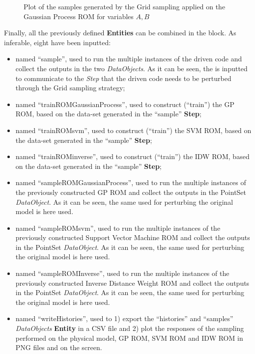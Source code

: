 \begin{enumerate}
\begin{figure}[h!]
  \caption{Plot of the samples generated by the Grid sampling applied on the Gaussian Process ROM for variables $A,B$}
  \label{fig:ROMgp_samples}
 \end{figure}
   Finally, all the previously defined \textbf{Entities} can be combined in
   the  block. As inferable,
   eight  have been inputted:
   \begin{itemize}
     \item {} named ``sample'', used to run the multiple
     instances of the driven code and
     collect the outputs in the two \textit{DataObjects}. As it can be
     seen, the  is inputted to communicate to the
     \textit{Step} that the driven code needs to
     be perturbed through the Grid sampling strategy;
     \item {} named ``trainROMGaussianProcess'', used to construct (``train'')
     the GP ROM, based on the data-set generated in the  ``sample'' \textbf{Step};
     \item {} named ``trainROMsvm'', used to construct (``train'')
     the SVM ROM, based on the data-set generated in the  ``sample'' \textbf{Step};
     \item {} named ``trainROMinverse'', used to construct (``train'')
     the IDW ROM, based on the data-set generated in the  ``sample'' \textbf{Step};
     \item {} named ``sampleROMGaussianProcess'', used to run the multiple
     instances of the previously constructed GP ROM and
     collect the outputs in the PointSet \textit{DataObject}. As it can be
     seen, the same  used for perturbing the original model is here used.
     \item {} named ``sampleROMsvm'', used to run the multiple
     instances of the previously constructed Support Vector Machine ROM and
     collect the outputs in the PointSet \textit{DataObject}. As it can be
     seen, the same  used for perturbing the original model is here used.
     \item {} named ``sampleROMInverse'', used to run the multiple
     instances of the previously constructed Inverse Distance Weight ROM and
     collect the outputs in the PointSet \textit{DataObject}. As it can be
     seen, the same  used for perturbing the original model is here used.
     \item  {} named ``writeHistories'', used to 1) export
     the ``histories'' and ``samples''  \textit{DataObjects}
     \textbf{Entity} in a CSV file and 2) plot the responses of the sampling performed on the physical model, GP ROM,
     SVM ROM and IDW ROM in  PNG files and on the screen.
   \end{itemize}
\end{enumerate}

